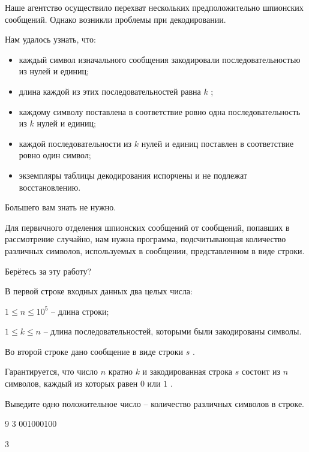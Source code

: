 
Наше агентство осуществило перехват нескольких предположительно шпионских сообщений. Однако возникли проблемы при декодировании.

Нам удалось узнать, что:

\begin{itemize}
\item каждый символ изначального сообщения закодировали последовательностью из нулей и единиц;
\item длина каждой из этих последовательностей равна $k$ ;
\item каждому символу поставлена в соответствие ровно одна последовательность из $k$ нулей и единиц;
\item каждой последовательности из $k$ нулей и единиц поставлен в соответствие ровно один символ;
\item экземпляры таблицы декодирования испорчены и не подлежат восстановлению.
\end{itemize}

Большего вам знать не нужно.

Для первичного отделения шпионских сообщений от сообщений, попавших в рассмотрение случайно, нам нужна программа, подсчитывающая количество различных символов, используемых в сообщении, представленном в виде строки.

Берётесь за эту работу?


В первой строке входных данных два целых числа:

$1 \le n \le 10^{5}$ -- длина строки;

$1 \le k \le n$ -- длина последовательностей, которыми были закодированы символы.

Во второй строке дано сообщение в виде строки $s$ .

Гарантируется, что число $n$ кратно $k$ и закодированная строка $s$ состоит из $n$ символов, каждый из которых равен $0$ или $1$ .

\outputfmtSection

Выведите одно положительное число -- количество различных символов в строке.

\exampleSection


\begin{myverbbox}[\small]{\vinput}
9 3
001000100
\end{myverbbox}
\begin{myverbbox}[\small]{\voutput}
3
\end{myverbbox}

